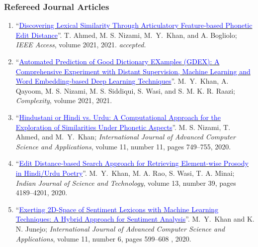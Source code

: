 \documentclass[a4paper, 10pt]{article}
\begin{document}
\subsubsection*{{ Refereed Journal Articles}}
\begin{enumerate}
\itemsep-4pt

\item ``\href{https://arxiv.org/abs/2008.06865}{\textcolor{blue}{Discovering Lexical Similarity Through Articulatory Feature-based Phonetic Edit Distance}}''. T. Ahmed, M. S. Nizami, \textcolor{NavyBlue}{M.~Y.~Khan}, and A. Bogliolo; \emph{IEEE Access}, volume 2021, 2021. \qonetag{\textcolor{white}{\bfseries Q1}}   {\small\it accepted.}

\item ``\href{https://doi.org/10.1155/2021/2553199}{\textcolor{blue}{Automated Prediction of Good Dictionary EXamples (GDEX): A Comprehensive Experiment with Distant Supervision, Machine Learning and Word Embedding-based Deep Learning Techniques}}''. \textcolor{NavyBlue}{M.~Y.~Khan}, A. Qayoom, M. S. Nizami, M. S. Siddiqui, S. Wasi, and S. M. K. R. Raazi; \emph{Complexity}, volume 2021, 2021. \qonetag{\textcolor{white}{\bfseries Q1}}  

\item ``\href{https://dx.doi.org/10.14569/IJACSA.2020.0111191}{\textcolor{blue}{Hindustani or Hindi vs. Urdu: A Computational Approach for the Exploration of Similarities Under Phonetic Aspects}}''. M. S. Nizami, T. Ahmed, and \textcolor{NavyBlue}{M.~Y.~Khan}; \emph{International Journal of Advanced Computer Science and Applications}, volume 11, number 11, pages 749--755, 2020. \qthreetag{\textcolor{white}{\bfseries Q3}} 

\item ``\href{https://doi.org/10.17485/IJST/v13i39.1489}{\textcolor{blue}{Edit Distance-based Search Approach for Retrieving Element-wise Prosody in Hindi/Urdu Poetry}}''. \textcolor{NavyBlue}{M.~Y.~Khan}, M. A. Rao, S. Wasi, T. A. Minai; \emph{Indian Journal of Science and Technology}, volume 13, number 39, pages 4189--4201, 2020. 

\item ``\href{https://doi.org/10.14569/IJACSA.2020.0110672}{\textcolor{blue}{Exerting 2D-Space of Sentiment Lexicons with Machine Learning Techniques: A Hybrid Approach for Sentiment Analysis}}''. \textcolor{NavyBlue}{M.~Y.~Khan} and K. N. Junejo; \emph{International Journal of Advanced Computer Science and Applications}, volume 11, number 6, pages 599--608
, 2020. \qthreetag{\textcolor{white}{\bfseries Q3}} 


\end{enumerate}
\end{document}
